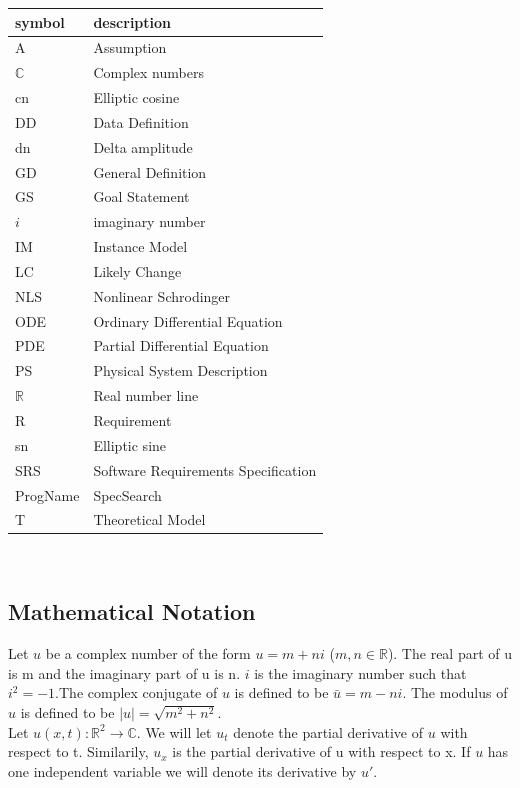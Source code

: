 \documentclass[12pt]{article}
\newcommand{\progname}{ProgName} %
\begin{document}
\renewcommand{\arraystretch}{1.2}
\begin{tabular}{l l} 
  \toprule		
  \textbf{symbol} & \textbf{description}\\
  \midrule 
  A & Assumption\\
  $\mathbb{C}$ & Complex numbers\\
  cn & Elliptic cosine \\
  DD & Data Definition\\
  dn & Delta amplitude \\
  GD & General Definition\\
  GS & Goal Statement\\
  $i$ & imaginary number\\
  IM & Instance Model\\
  LC & Likely Change\\
  NLS & Nonlinear Schrodinger\\
  ODE & Ordinary Differential Equation\\
  PDE & Partial Differential Equation\\
  PS & Physical System Description\\
  $\mathbb{R}$ & Real number line\\
  R & Requirement\\ 
  sn & Elliptic sine\\
  SRS & Software Requirements Specification\\
  \progname{} & SpecSearch\\
  T & Theoretical Model\\  
  \bottomrule
\end{tabular}\\

\subsection{Mathematical Notation}

Let $u$ be a complex number of the form $u= m + ni$ ($m,n \in 
\mathbb{R}$). The real part of u is m and the imaginary part of u is n. $i$ is 
the imaginary number such that $i^{2}=-1$.The complex 
conjugate of $u$ is defined to be $\bar{u}= m - ni$. 
The modulus of $u$ is defined to be $|u| = \sqrt{m^{2}+n^{2}}$.\\

Let $u(x,t): \mathbb{R}^{2} \rightarrow \mathbb{C}$. We will let $u_{t}$ denote 
the partial derivative of $u$ with respect to t. Similarily, $u_{x}$ is the 
partial derivative of u with respect to x. If $u$ has one independent 
variable we will denote its derivative by $u'$. \\ 
\end{document}
